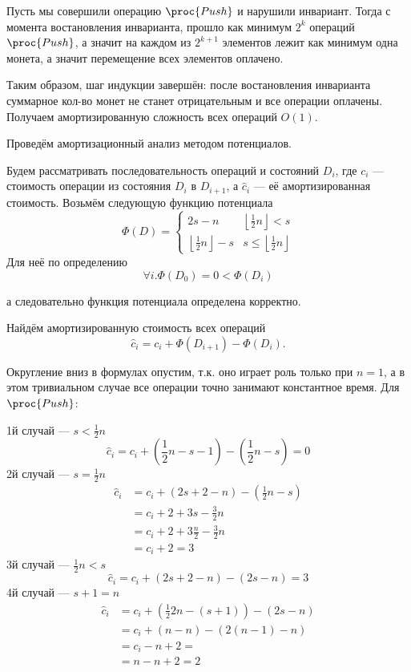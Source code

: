 \documentclass[11pt]{article}
\begin{document}
Пусть мы совершили операцию $\proc{Push}$ и нарушили инвариант. Тогда с момента востановления инварианта, прошло как минимум $2^{k}$ операций $\proc{Push}$, а значит на каждом из $2^{k+1}$ элементов лежит как минимум одна монета, а значит перемещение всех элементов оплачено.

Таким образом, шаг индукции завершён: после востановления инварианта суммарное кол-во монет не станет отрицательным и все операции оплачены. Получаем амортизированную сложность всех операций $O(1)$.

\hspace{1 mm}\linebreak

Проведём амортизационный анализ методом потенциалов.

Будем рассматривать последовательность операций и состояний $D_i$, где $c_i$ — стоимость операции из состояния $D_i$ в $D_{i+1}$, а $\hat{c}_i$ — её амортизированная стоимость. Возьмём следующую функцию потенциала
\[
	\Phi(D)=
		\begin{cases}
			2s-n & \left\lfloor\frac{1}{2}n\right\rfloor < s \\
			\left\lfloor\frac{1}{2}n\right\rfloor-s & s \leq \left\lfloor\frac{1}{2}n\right\rfloor
		\end{cases}
\]
Для неё по определению
\[
	\forall i. \Phi(D_0) = 0 < \Phi(D_i)
\]

а следовательно функция потенциала определена корректно.

Найдём амортизированную стоимость всех операций
\[
	\hat{c}_i= c_i + \Phi(D_{i+1}) - \Phi(D_i).
\]

Округление вниз в формулах опустим, т.к. оно играет роль только при $n=1$, а в этом тривиальном случае все операции точно занимают константное время. Для $\proc{Push}$:

1й случай — $s < \frac{1}{2}n$
\[
	\hat{c}_i= c_i + (\frac{1}{2}n-s-1) - (\frac{1}{2}n-s) = 0
\]
2й случай — $s = \frac{1}{2}n$
\begin{equation}
	\begin{split}
		\hat{c}_i & =  c_i + (2s+2-n) - (\frac{1}{2}n-s) \\ 
			& = c_i + 2 + 3s-\frac{3}{2}n \\
			& = c_i+2 +3\frac{n}{2}-\frac{3}{2}n \\
			& = c_i + 2 = 3
	\end{split}
\end{equation}
3й случай — $\frac{1}{2}n < s$
\[
	\hat{c}_i= c_i + (2s+2-n) - (2s-n) = 3
\]
4й случай — $s+1 = n$
\begin{equation}
	\begin{split}
		\hat{c}_i & = c_i + (\frac{1}{2}2n-(s+1)) - (2s-n) \\
			& = c_i + (n-n)-(2(n-1)-n) \\
			& = c_i - n + 2 = \\
			& = n - n + 2 = 2
	\end{split}
\end{equation}
\end{document}
